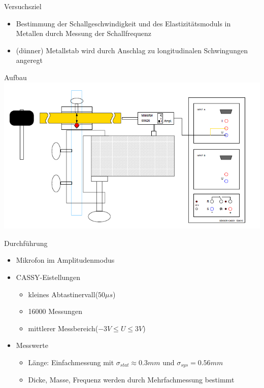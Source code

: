 \documentclass[12pt]{beamer}
\begin{document}


\begin{frame}{Versuchsziel}
\begin{itemize}
\item Bestimmung der Schallgeschwindigkeit und des Elastizitätsmoduls in Metallen durch Messung der Schallfrequenz
\item (dünner) Metallstab wird durch Anschlag zu longitudinalen Schwingungen angeregt 
\end{itemize}
\end{frame}

\begin{frame}{Aufbau}
\includegraphics[width=\linewidth,height=\textheight,keepaspectratio]{Bilder/AufbauMessungSchallgeschwindigkeitMetallstab.PNG}
\centering
\end{frame}

\begin{frame}{Durchführung}
\begin{itemize}
\item Mikrofon im Amplitudenmodus
\item CASSY-Eistellungen
\begin{itemize}
\item kleines Abtastinervall($50\mu s$)
\item 16000 Messungen
\item mittlerer Messbereich($-3V\leq U\leq 3V$)
\end{itemize}
\item Messwerte
\begin{itemize}
\item Länge: Einfachmessung mit $\sigma_{stat}\approx0.3mm$ und $\sigma_{sys}=0.56mm$
\item Dicke, Masse, Frequenz werden durch Mehrfachmessung bestimmt
\end{itemize}
\end{itemize}
\end{frame}
\end{document}
